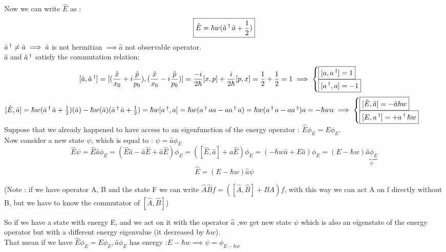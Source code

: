 \documentclass[12pt,oneside]{book}
\begin{document}
Now we can write $\hat{E}$ as :
\[\boxed{\hat{E} = \hbar w(\hat{a}\operatorname{^\dagger}\hat{a}+\frac{1}{2})}\]
$\hat{a}\operatorname{^\dagger} \not = \hat{a} \implies \hat{a}$ is not hermitian $\implies \hat{a}$ not observable operator. \\
$\hat{a}$ and $\hat{a}\operatorname{^\dagger}$ satisfy the commutation relation:
\[[\hat{a},\hat{a}\operatorname{^\dagger}] = [(\frac{\hat{x}}{x_0}+i\frac{\hat{p}}{p_0}),(\frac{\hat{x}}{x_0}-i\frac{\hat{p}}{p_0})] = \frac{-i}{2\hbar}[x,p] + \frac{i}{2\hbar}[p,x] = \frac{1}{2} + \frac{1}{2} = 1\implies \begin{cases}
		\boxed{[a,a\operatorname{^\dagger}] = 1} \\
		\boxed{[a\operatorname{^\dagger},a] = -1}
	\end{cases}\]
$[\hat{E},\hat{a}]=\hbar w(\hat{a}\operatorname{^\dagger}\hat{a} + \frac{1}{2})(\hat{a})-\hbar w(\hat{a})(\hat{a}\operatorname{^\dagger}\hat{a} + \frac{1}{2})=\hbar w[a\operatorname{^\dagger},a]=\hbar w (a\operatorname{^\dagger} a a - a a\operatorname{^\dagger} a)\\
	= \hbar w(a\operatorname{^\dagger} a - a a\operatorname{^\dagger})a=-\hbar w a\implies \begin{cases}\boxed{[\hat{E},\hat{a}] = -\hat{a}\hbar w }\\ \boxed{[E,a\operatorname{^\dagger}] = + a\operatorname{^\dagger} \hbar w}\end{cases}$\\
Suppose that we already happened to have access to an eigenfunction of the energy operator : $\hat{E} \phi_E = E \phi_E $.\\
Now consider a new state $\psi$, which is equal to : $\psi = \hat{a}\phi_E$\\
\[\hat{E}\psi = \hat{E}\hat{a}\phi_E = (\hat{E}\hat{a}-\hat{a}\hat{E} + \hat{a}\hat{E})\phi_E= ([\hat{E},\hat{a}] + a \hat{E})\phi_E =(-\hbar w \hat{a} + E \hat{a})\phi_E = (E -\hbar w )\underbrace{\hat{a}\phi_E}_\psi\]
\[\boxed{\hat{E} =(E -\hbar w )\hat{a}\psi}\]
\begin{center}
	(Note : if we have operator A, B and the state F we can write $\hat{A}\hat{B}f = ([\hat{A},\hat{B}]+BA)f$, with this way we can act A on f directly without B,  but we have to know the commutator of $[\hat{A},\hat{B}]$)
\end{center}
So if we have a state with energy E, and we act on it with the operator $\hat{a}$ ,we get new state $\psi$ which is also an eigenstate of the energy operator but with a different energy eigenvalue (it decreased by $\hbar w$).\\
That mean if we have $\hat{E}\phi_E = E \phi_E, \hat{a}\phi_E $ has energy :$ E-\hbar w \implies \psi = \phi_{E-\hbar w}$ \\
\end{document}
